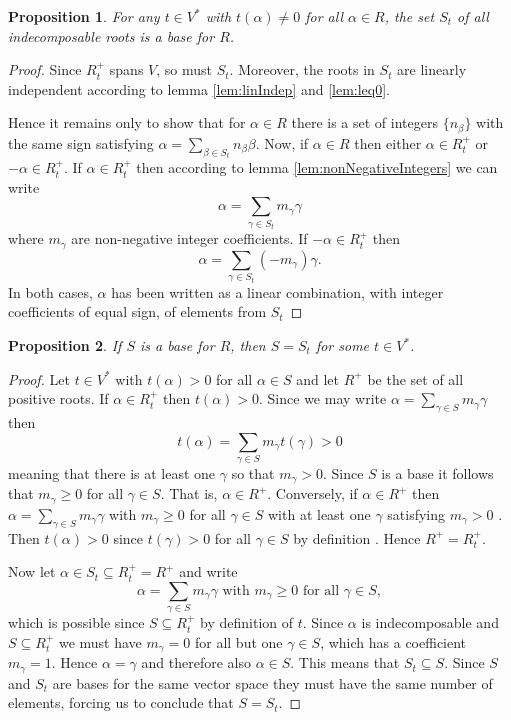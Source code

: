 \documentclass[twoside,utf8]{article}
\theoremstyle{plain}
\newtheorem{proposition}{Proposition}
\theoremstyle{definition}
\theoremstyle{remark}
\begin{document}
\begin{proposition}
For any $t\in V^*$ with $t(\alpha) \neq 0$ for all $\alpha \in R$, the set $S_t$ of all indecomposable roots is a base for $R$.
\end{proposition}
\begin{proof}
Since $R^+_t$ spans $V$, so must $S_t$. Moreover, the roots in $S_t$ are linearly independent according to lemma \ref*{lem:linIndep} and \ref*{lem:leq0}. 

Hence it remains only to show that for $\alpha \in R$ there is a set of integers $\{n_\beta\}$ with the same sign satisfying $\alpha = \sum_{\beta\in S_t} n_\beta \beta$. Now, if $\alpha \in R$ then either $\alpha \in R^+_t$ or $-\alpha \in R^+_t$. If $\alpha \in R^+_t$ then according to lemma \ref*{lem:nonNegativeIntegers} we can write 
\[
\alpha = \sum_{\gamma \in S_t} m_\gamma \gamma
\]
where $m_\gamma$ are non-negative integer coefficients. If $-\alpha \in R^+_t$ then 
\[
\alpha = \sum_{\gamma \in S_t} (-m_\gamma) \gamma.
\]
In both cases, $\alpha$ has been written as a linear combination, with integer coefficients of equal sign, of elements from $S_t$
\end{proof}


\begin{proposition} \label{prop:SisSt}
If $S$ is a base for $R$, then $S=S_t$ for some $t\in V^*$.
\end{proposition}
\begin{proof}
Let $t\in V^*$ with $t(\alpha)>0$ for all $\alpha \in S$ and let $R^+$ be the set of all positive roots. If $\alpha \in R^+_t$ then $t(\alpha)>0$. Since we may write $\alpha=\sum_{\gamma\in S}m_\gamma \gamma$ then 
\[
t(\alpha)=\sum_{\gamma\in S}m_\gamma t(\gamma)>0
\]
meaning that there is at least one $\gamma$ so that $m_\gamma>0$. Since $S$ is a base it follows that $m_\gamma \geq 0$ for all $\gamma \in S$. That is, $\alpha \in R^+$. Conversely, if $\alpha \in R^+$ then $\alpha=\sum_{\gamma\in S}m_\gamma \gamma$ with $m_\gamma \geq 0$ for all $\gamma\in S$ with at least one $\gamma$ satisfying $m_\gamma > 0$ . Then $t(\alpha)>0$ since $t(\gamma)>0$ for all $\gamma \in S$ by definition . Hence $R^+ = R^+_t$.

Now let $\alpha \in S_t \subseteq R^+_t = R^+$ and write 
\[
\alpha=\sum_{\gamma \in S} m_\gamma \gamma \mbox{ with } m_\gamma\geq 0 \mbox{ for all } \gamma \in S,
\]
which is possible since $S\subseteq R^+_t$ by definition of $t$. Since $\alpha$ is indecomposable and $S\subseteq R^+_t$ we must have $m_\gamma = 0$ for all but one $\gamma \in S$, which has a coefficient $m_\gamma=1$. Hence $\alpha = \gamma$ and therefore also $\alpha \in S$. This means that $S_t \subseteq S$. Since $S$ and $S_t$ are bases for the same vector space they must have the same number of elements, forcing us to conclude that $S=S_t$.
\end{proof}
\end{document}
